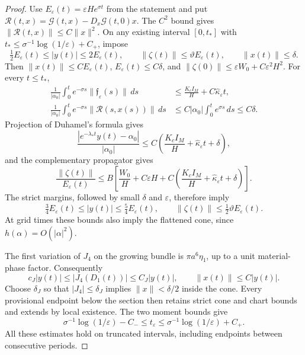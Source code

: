 \documentclass[11pt]{amsart}
\theoremstyle{remark}
\numberwithin{equation}{section}
\begin{document}
\begin{proof}
Use $E_\varepsilon(t)=\varepsilon H e^{\sigma t}$ from the
statement and put
$\mathcal R(t,x)=\mathcal G(t,x)-D_x\mathcal G(t,0)x$.
The $C^2$ bound gives $\|\mathcal R(t,x)\|\le C\|x\|^2$.
On any existing interval $[0,t_*]$ with
$t_*\le\sigma^{-1}\log(1/\varepsilon)+C_+$, impose
\begin{equation}\label{pc:continuous-bootstrap}
 \tfrac12E_\varepsilon(t)\le|y(t)|\le2E_\varepsilon(t),\qquad
 \|\zeta(t)\|\le\vartheta E_\varepsilon(t),\qquad\|x(t)\|\le\delta.
\end{equation}
Then $\|x(t)\|\le CE_\varepsilon(t)$,
$E_\varepsilon(t)\le C\delta$, and
$\|\zeta(0)\|\le\varepsilon W_0+C\varepsilon^2H^2$.
For every $t\le t_*$,
\begin{align}\label{pc:continuous-weighted}
 \frac1{|\alpha_0|}\int_0^t e^{-\sigma s}
       \|\mathfrak f_\varepsilon(s)\|\,ds
 &\le\frac{K_cI_M}{H}+C\widehat\kappa_\varepsilon t,\\
 \frac1{|\alpha_0|}\int_0^t e^{-\sigma s}
       \|\mathcal R(s,x(s))\|\,ds
 &\le C|\alpha_0|\int_0^t e^{\sigma s}\,ds\le C\delta.\nonumber
\end{align}
Projection of Duhamel's formula gives
\begin{equation}\label{pc:continuous-growing}
 \frac{|e^{-\lambda_*t}y(t)-\alpha_0|}{|\alpha_0|}
 \le C\left(\frac{K_cI_M}{H}+\widehat\kappa_\varepsilon t+\delta\right),
\end{equation}
and the complementary propagator gives
\begin{equation}\label{pc:continuous-complement}
 \frac{\|\zeta(t)\|}{E_\varepsilon(t)}
 \le B\left[\frac{W_0}{H}+C\varepsilon H
       +C\left(\frac{K_cI_M}{H}+\widehat\kappa_\varepsilon t+\delta\right)
       \right].
\end{equation}
The strict margins, followed by small $\delta$ and $\varepsilon$,
therefore imply
\[
 \tfrac34E_\varepsilon(t)\le|y(t)|\le\tfrac54E_\varepsilon(t),\qquad
 \|\zeta(t)\|\le\tfrac12\vartheta E_\varepsilon(t).
\]
At grid times these bounds also imply the flattened cone, since
$h(\alpha)=O(|\alpha|^2)$.

The first variation of $J_4$ on the growing bundle is
$\pi a^6\eta_1$, up to a unit material-phase factor. Consequently
\begin{equation}\label{pc:continuous-moment-comparison}
 c_J|y(t)|\le|J_4(D_1(t))|\le C_J|y(t)|,\qquad
 \|x(t)\|\le C|y(t)|.
\end{equation}
Choose $\delta_J$ so that $|J_4|\le\delta_J$ implies
$\|x\|<\delta/2$ inside the cone. Every provisional endpoint
below the section then retains strict cone and chart bounds and
extends by local existence. The two moment bounds give
\[
 \sigma^{-1}\log(1/\varepsilon)-C_-
       \le t_\varepsilon\le\sigma^{-1}\log(1/\varepsilon)+C_+.
\]
All these estimates hold on truncated intervals, including
endpoints between consecutive periods.


\end{proof}
\end{document}
